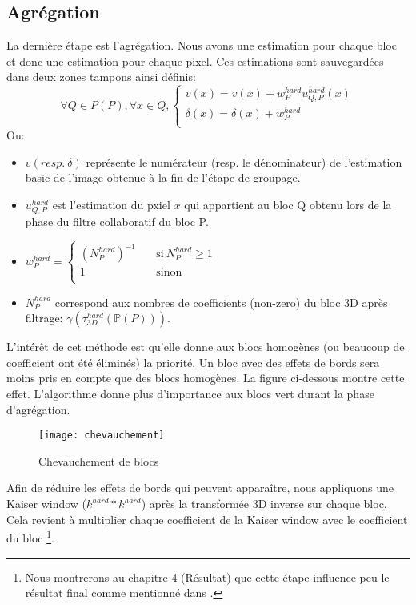 \subsection{Agrégation}
La dernière étape est l'agrégation. Nous avons une estimation pour chaque bloc et donc une estimation pour chaque pixel. Ces estimations sont sauvegardées dans deux zones tampons ainsi définis:
\[ \forall Q \in  P(P), \forall x \in Q, 
  \begin{cases}
    v(x) = v(x) + w^{hard}_P u^{hard}_{Q,P}(x) \\
    \delta(x) = \delta(x) + w^{hard}_P  \\
  \end{cases}
\]
Ou:
\begin{itemize}
\item \(v (resp. \: \delta ) \) représente le numérateur (resp. le dénominateur) de l'estimation basic de l'image obtenue à la fin de l'étape de groupage.
\item \(u^{hard}_{Q,P} \) est l'estimation du pxiel \(x \) qui appartient au bloc Q obtenu lors de la phase du filtre collaboratif du bloc P.
\item \( w^{hard}_P  = \begin{cases} (N^{hard}_P)^{-1}  & \quad \text{si} \: N^{hard}_P \ge 1 \\ 1  & \quad\text{sinon}\\ \end{cases} \) 
\item \( N^{hard}_P \) correspond aux nombres de coefficients (non-zero) du bloc 3D après filtrage: \(\gamma ( \tau^{hard}_{3D} (\mathbb{P}(P))) \). 
\end{itemize}
\newpage
L'intérêt de cet méthode est qu'elle donne aux blocs homogènes (ou beaucoup de coefficient ont été éliminés) la priorité. Un bloc avec des effets de bords sera moins pris en compte que des blocs homogènes. La figure ci-dessous montre cette effet. L'algorithme donne plus d'importance aux blocs vert durant la phase d'agrégation.
\begin{figure}[h]    
    \centering
    \texttt{[image: chevauchement]}
    \caption{Chevauchement de blocs}
\end{figure}
\newline
\newline
Afin de réduire les effets de bords qui peuvent apparaître, nous appliquons une Kaiser window (\( k^{hard} * k^{hard}\)) après la transformée 3D inverse sur chaque bloc. Cela revient à multiplier chaque coefficient de la Kaiser window avec le coefficient du bloc \footnote{Nous montrerons au chapitre 4 (Résultat) que cette étape influence peu le résultat final comme mentionné dans \cite{2}.}.  
